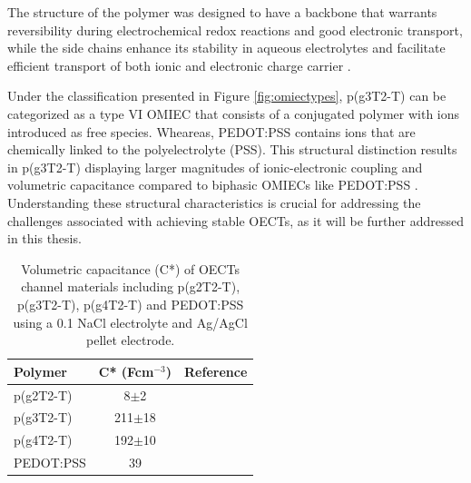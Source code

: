 The structure of the polymer was designed to have a backbone that warrants reversibility during electrochemical redox reactions and good electronic transport, while the side chains enhance its stability in aqueous electrolytes and facilitate efficient transport of both ionic and electronic charge carrier \cite{moiaDesignEvaluationConjugated2019}. 



Under the classification presented in Figure \ref{fig:omiectypes}, p(g3T2-T) can be categorized as a type VI OMIEC that consists of a conjugated polymer with ions introduced as free species. Wheareas, PEDOT:PSS contains ions that are chemically linked to the polyelectrolyte (PSS). This structural distinction results in p(g3T2-T) displaying larger magnitudes of ionic-electronic coupling and volumetric capacitance compared to biphasic OMIECs like PEDOT:PSS \cite{paulsenOrganicMixedIonic2020}. Understanding these structural characteristics is crucial for addressing the challenges associated with achieving stable OECTs, as it will be further addressed in this thesis.%

\begin{table}[ht]
	\centering
	\caption[Volumetric capacitance (C*) of various OECTs channel materials]{Volumetric capacitance (C*) of OECTs channel materials including p(g2T2-T), p(g3T2-T), p(g4T2-T) and PEDOT:PSS using a 0.1 NaCl electrolyte and Ag/AgCl pellet electrode.}
	\begin{tabular}{l c c} \hline
		Polymer	&  C* (Fcm$^{-3}$) & Reference \\ \hline
		p(g2T2-T) & 8$\pm$2 & \cite{moserEthyleneGlycolBasedSide2020}\\
		p(g3T2-T) & 211$\pm$18 & \cite{moserEthyleneGlycolBasedSide2020}\\
		p(g4T2-T) & 192$\pm$10 & \cite{moserEthyleneGlycolBasedSide2020}\\  
		PEDOT:PSS & 39 & \cite{inalBenchmarkingOrganicMixed2017}\\\hline
	\end{tabular}
	\label{tab:perf}
\end{table}



